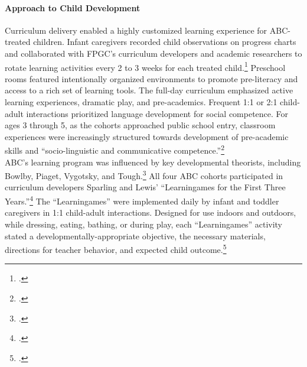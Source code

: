 \begin{appendices}
\paragraph{Approach to Child Development}
\noindent Curriculum delivery enabled a highly customized learning experience for ABC-treated children. Infant caregivers recorded child observations on progress charts and collaborated with FPGC's curriculum developers and academic researchers to rotate learning activities every 2 to 3 weeks for each treated child.\footnote{\citet{Ramey_Collier_etal_1976_CarolinaAbecedarianProject,Campbell_Ramey_1994_CD}.} Preschool rooms featured intentionally organized environments to promote pre-literacy and access to a rich set of learning tools. The full-day curriculum emphasized active learning experiences, dramatic play, and pre-academics. Frequent 1:1 or 2:1 child-adult interactions prioritized language development for social competence. For ages 3 through 5, as the cohorts approached public school entry, classroom experiences were increasingly structured  towards development of pre-academic skills and ``socio-linguistic and communicative competence.''\footnote{\citet{Ramey-et-al_1977_Intro-to-ABC, Haskins_1985_CD, Ramey_1981_Modification, Ramey_Campbell_1979_SR, Ramey_Smith_1977_AJMD, Ramey_McGinness_etal_1982_Abecedarianapproach, Sparling_Lewis_1979_BOOKLearninggamesFirstThree,Sparling_Lewis_1984_BOOKLearningGamesThreesFours}.}\\

\noindent ABC's learning program was influenced by key developmental theorists, including Bowlby, Piaget, Vygotsky, and Tough.\footnote{\citet{Sparling_1974_Synth_Edu_Infant_SPEECH,Mcginness_1981_Developing,abc2014-2015interviews}.} All four ABC cohorts participated in curriculum developers Sparling and Lewis' ``Learningames for the First Three Years.''\footnote{ \citet{Sparling_Lewis_1979_BOOKLearninggamesFirstThree}.} The ``Learningames'' were implemented daily by infant and toddler caregivers in 1:1 child-adult interactions. Designed for use indoors and outdoors, while dressing, eating, bathing, or during play, each ``Learningames'' activity stated a developmentally-appropriate objective, the necessary materials, directions for teacher behavior, and expected child outcome.\footnote{\citet{Ramey_Campbell_1979_SR, Ramey_1981_Modification,Sparling_Lewis_1979_BOOKLearninggamesFirstThree}.}\\


\end{appendices}
